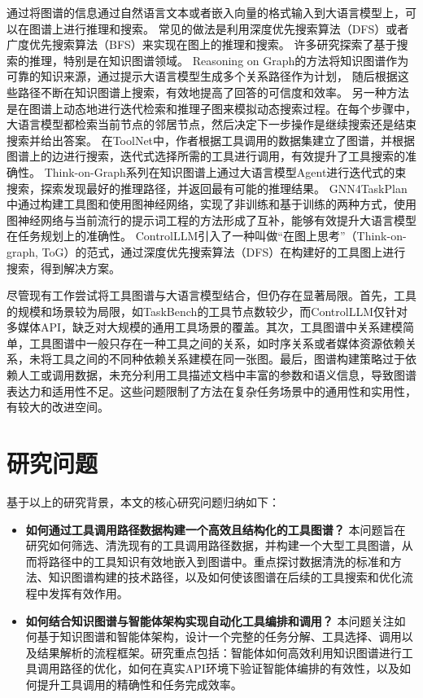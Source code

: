 通过将图谱的信息通过自然语言文本或者嵌入向量的格式输入到大语言模型上，可以在图谱上进行推理和搜索。
常见的做法是利用深度优先搜索算法（DFS）或者广度优先搜索算法（BFS）来实现在图上的推理和搜索。
许多研究探索了基于搜索的推理，特别是在知识图谱领域。
Reasoning on Graph\cite{Luo2023}的方法将知识图谱作为可靠的知识来源，通过提示大语言模型生成多个关系路径作为计划，
随后根据这些路径不断在知识图谱上搜索，有效地提高了回答的可信度和效率。
另一种方法是在图谱上动态地进行迭代检索和推理子图来模拟动态搜索过程\cite{Liu2024, Sun2023, Ma2024}。在每个步骤中，大语言模型都检索当前节点的邻居节点，然后决定下一步操作是继续搜索还是结束搜索并给出答案。
在ToolNet\cite{Liu2024}中，作者根据工具调用的数据集建立了图谱，并根据图谱上的边进行搜索，迭代式选择所需的工具进行调用，有效提升了工具搜索的准确性。
Think-on-Graph系列\cite{Sun2023,Ma2024}在知识图谱上通过大语言模型Agent进行迭代式的束搜索，探索发现最好的推理路径，并返回最有可能的推理结果。
GNN4TaskPlan中\cite{wucan2024}通过构建工具图和使用图神经网络，实现了非训练和基于训练的两种方式，使用图神经网络与当前流行的提示词工程的方法形成了互补，能够有效提升大语言模型在任务规划上的准确性。
ControlLLM\cite{Liu2023a}引入了一种叫做“在图上思考”（Think-on-graph, ToG）的范式，通过深度优先搜索算法（DFS）在构建好的工具图上进行搜索，得到解决方案。

尽管现有工作尝试将工具图谱与大语言模型结合，但仍存在显著局限。首先，工具的规模和场景较为局限，如TaskBench\cite{shen2023taskbench}的工具节点数较少，而ControlLLM\cite{Liu2023a}仅针对多媒体API，缺乏对大规模的通用工具场景的覆盖。其次，工具图谱中关系建模简单，工具图谱中一般只存在一种工具之间的关系，如时序关系\cite{Liu2024}或者媒体资源依赖关系\cite{Liu2023a}，未将工具之间的不同种依赖关系建模在同一张图。最后，图谱构建策略过于依赖人工或调用数据，未充分利用工具描述文档中丰富的参数和语义信息，导致图谱表达力和适用性不足。这些问题限制了方法在复杂任务场景中的通用性和实用性，有较大的改进空间。

\section{研究问题}

基于以上的研究背景，本文的核心研究问题归纳如下：
\begin{itemize}
    \item \textbf{如何通过工具调用路径数据构建一个高效且结构化的工具图谱？}
   本问题旨在研究如何筛选、清洗现有的工具调用路径数据，并构建一个大型工具图谱，从而将路径中的工具知识有效地嵌入到图谱中。重点探讨数据清洗的标准和方法、知识图谱构建的技术路径，以及如何使该图谱在后续的工具搜索和优化流程中发挥有效作用。
    \item \textbf{如何结合知识图谱与智能体架构实现自动化工具编排和调用？}
   本问题关注如何基于知识图谱和智能体架构，设计一个完整的任务分解、工具选择、调用以及结果解析的流程框架。研究重点包括：智能体如何高效利用知识图谱进行工具调用路径的优化，如何在真实API环境下验证智能体编排的有效性，以及如何提升工具调用的精确性和任务完成效率。
\end{itemize}

